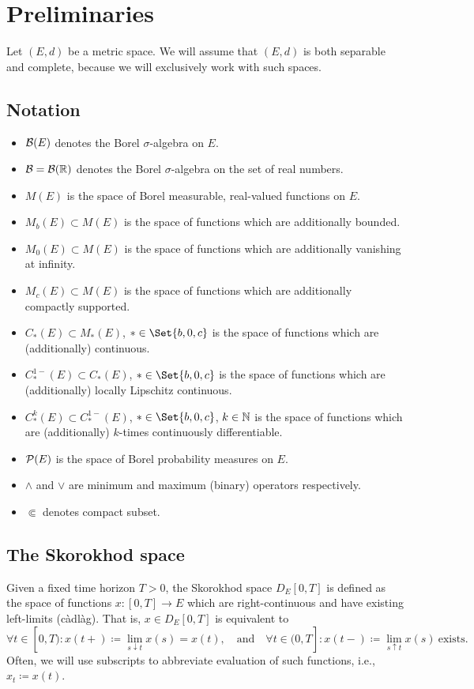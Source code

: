 \section{Preliminaries}

Let \((E, d)\) be a metric space.
We will assume that \((E, d)\) is both separable and complete, because we will exclusively work with such spaces.

\subsection{Notation}
\begin{itemize}
  \item \(\mathcal{B}(E)\) denotes the Borel \( \sigma \)-algebra on \(E\).
  \item \( \mathcal{B} = \mathcal{B}(\mathbb{R}) \) denotes the Borel \( \sigma \)-algebra on the set of real numbers.
  \item \(M(E)\) is the space of Borel measurable, real-valued functions on \(E\).
  \item \(M_b(E) \subset M(E)\) is the space of functions which are additionally bounded.
  \item \(M_0(E) \subset M(E)\) is the space of functions which are additionally vanishing at infinity.
  \item \(M_c(E) \subset M(E)\) is the space of functions which are additionally compactly supported.
  \item \(C_*(E) \subset M_*(E)\), \( * \in \Set{b, 0, c} \) is the space of functions which are (additionally) continuous.
  \item \(C_*^{1-}(E) \subset C_*(E)\), \( * \in \Set{b, 0, c} \) is the space of functions which are (additionally) locally Lipschitz continuous.
  \item \(C_*^{k}(E) \subset C_*^{1-}(E)\), \( * \in \Set{b, 0, c} \), \( k \in \mathbb{N} \) is the space of functions which are (additionally) \(k\)-times continuously differentiable.
  \item \(\mathcal{P}(E)\) is the space of Borel probability measures on \(E\).
  \item \( \land \) and \( \lor \) are minimum and maximum (binary) operators respectively.
  \item \( \Subset \) denotes compact subset.
\end{itemize}


\subsection{The Skorokhod space} %
Given a fixed time horizon \( T > 0 \), the Skorokhod space \( D_E[0,T] \) is defined as the space of functions \(x : [0,T] \to E\) which are right-continuous and have existing left-limits (càdlàg).
That is, \(x \in D_E[0,T]\) is equivalent to
\begin{equation}
  \forall t \in [0,T) : x(t+) \coloneqq \lim_{s \downarrow t} x(s) = x(t), \quad\text{and}\quad \forall t \in (0,T] : x(t-) \coloneqq \lim_{s \uparrow t} x(s)\ \text{exists}.
\end{equation}
Often, we will use subscripts to abbreviate evaluation of such functions, i.e., \(x_t \coloneqq x(t)\).

